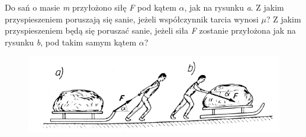 Do sań o masie \emph{m} przyłożono siłę \emph{F} pod kątem \emph{$\alpha$}, jak na rysunku \emph{a}. Z jakim przyspieszeniem poruszają się sanie, jeżeli współczynnik tarcia wynosi \emph{$\mu$}? Z jakim przyspieszeniem będą się poruszać sanie, jeżeli siła \emph{F} zostanie przyłożona jak na rysunku \emph{b}, pod takim samym kątem \emph{$\alpha$}?
\begin{figure}[h]
	\centering
	\includegraphics[width=0.3\linewidth]{../rysunki/dynamika/sanki-tarcie}
\end{figure}

